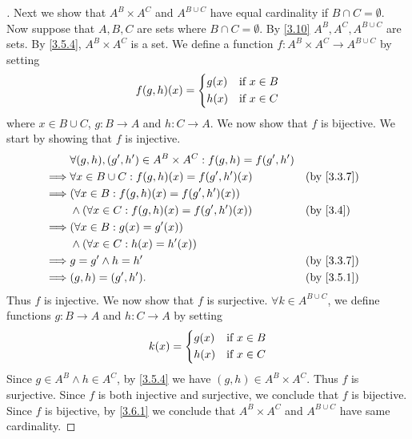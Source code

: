 \begin{proof}[]
	Next we show that \(A^B \times A^C\) and \(A^{B \cup C}\) have equal cardinality if \(B \cap C = \emptyset\).
	Now suppose that \(A, B, C\) are sets where \(B \cap C = \emptyset\).
	By \cref{3.10} \(A^B, A^C, A^{B \cup C}\) are sets.
	By \cref{3.5.4}, \(A^B \times A^C\) is a set.
	We define a function \(f : A^B \times A^C \to A^{B \cup C}\) by setting
	\[
		f(g, h)(x) = \begin{dcases}
			g(x) & \text{if } x \in B \\
			h(x) & \text{if } x \in C
		\end{dcases}
	\]
	where \(x \in B \cup C\), \(g : B \to A\) and \(h : C \to A\).
	We now show that \(f\) is bijective.
	We start by showing that \(f\) is injective.
	\begin{align*}
		         & \forall (g, h), (g', h') \in A^B \times A^C : f(g, h) = f(g', h')                 \\
		\implies & \forall x \in B \cup C : f(g, h)(x) = f(g', h')(x)                &  & \by{3.3.7} \\
		\implies & (\forall x \in B : f(g, h)(x) = f(g', h')(x))                                     \\
		         & \land (\forall x \in C : f(g, h)(x) = f(g', h')(x))               &  & \by{3.4}   \\
		\implies & (\forall x \in B : g(x) = g'(x))                                                  \\
		         & \land (\forall x \in C : h(x) = h'(x))                                            \\
		\implies & g = g' \land h = h'                                               &  & \by{3.3.7} \\
		\implies & (g, h) = (g', h').                                                &  & \by{3.5.1}
	\end{align*}
	Thus \(f\) is injective.
	We now show that \(f\) is surjective.
	\(\forall k \in A^{B \cup C}\), we define functions \(g : B \to A\) and \(h : C \to A\) by setting
	\[
		k(x) = \begin{dcases}
			g(x) & \text{if } x \in B \\
			h(x) & \text{if } x \in C
		\end{dcases}
	\]
	Since \(g \in A^B \land h \in A^C\), by \cref{3.5.4} we have \((g, h) \in A^B \times A^C\).
	Thus \(f\) is surjective.
	Since \(f\) is both injective and surjective, we conclude that \(f\) is bijective.
	Since \(f\) is bijective, by \cref{3.6.1} we conclude that \(A^B \times A^C\) and \(A^{B \cup C}\) have same cardinality.


\end{proof}
